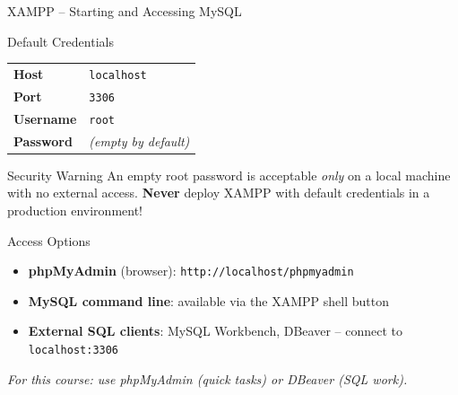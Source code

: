 \begin{frame}{XAMPP -- Starting and Accessing MySQL}
  \begin{block}{Default Credentials}
    \begin{tabular}{@{}ll@{}}
      \textbf{Host}     & \texttt{localhost} \\
      \textbf{Port}     & \texttt{3306} \\
      \textbf{Username} & \texttt{root} \\
      \textbf{Password} & \textit{(empty by default)} \\
    \end{tabular}
  \end{block}

  \begin{alertblock}{Security Warning}
    An empty root password is acceptable \textit{only} on a local machine with
    no external access. \textbf{Never} deploy XAMPP with default credentials
    in a production environment!
  \end{alertblock}

  \begin{block}{Access Options}
    \begin{itemize}
      \item \textbf{phpMyAdmin} (browser): \texttt{http://localhost/phpmyadmin}
      \item \textbf{MySQL command line}: available via the XAMPP shell button
      \item \textbf{External SQL clients}: MySQL Workbench, DBeaver --
            connect to \texttt{localhost:3306}
    \end{itemize}
    \textit{For this course: use phpMyAdmin (quick tasks) or DBeaver (SQL work).}
  \end{block}
\end{frame}
